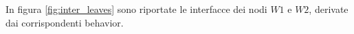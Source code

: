 \begin{ex}
In figura \ref{fig:inter_leaves} sono riportate le interfacce dei nodi $W1$ e $W2$, derivate dai corrispondenti behavior. 
\end{ex}

\begin{figure}[htbp]
\centering
{}
\hspace{5mm}
\subfigure[$Int(W2)$]

\end{figure}
